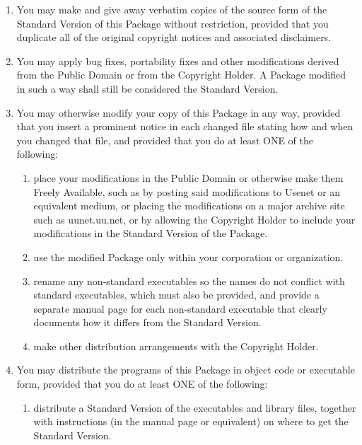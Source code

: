 \documentclass[a4paper]{article}
\begin{document}
\begin{enumerate}
\item You may make and give away verbatim copies of the source form of the
Standard Version of this Package without restriction, provided that you
duplicate all of the original copyright notices and associated disclaimers.

\item You may apply bug fixes, portability fixes and other modifications
derived from the Public Domain or from the Copyright Holder.  A Package
modified in such a way shall still be considered the Standard Version.

\item You may otherwise modify your copy of this Package in any way, provided
that you insert a prominent notice in each changed file stating how and
when you changed that file, and provided that you do at least ONE of the
following:
\begin{enumerate} %
    \item place your modifications in the Public Domain or otherwise make them
    Freely Available, such as by posting said modifications to Usenet or
    an equivalent medium, or placing the modifications on a major archive
    site such as uunet.uu.net, or by allowing the Copyright Holder to include
    your modifications in the Standard Version of the Package.


    \item use the modified Package only within your corporation 
      or organization.
 
    \item rename any non-standard executables so the names do not conflict
    with standard executables, which must also be provided, and provide
    a separate manual page for each non-standard executable that clearly
    documents how it differs from the Standard Version.


    \item make other distribution arrangements with the Copyright Holder.
\end{enumerate}

\item You may distribute the programs of this Package in object code or
executable form, provided that you do at least ONE of the following:
\begin{enumerate} %
    \item distribute a Standard Version of the executables and library files,
    together with instructions (in the manual page or equivalent) on where
    to get the Standard Version.


\end{enumerate}
\end{enumerate}
\end{document}
